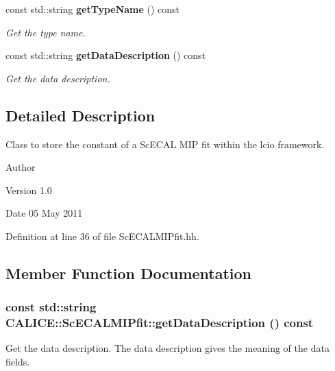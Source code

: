 \begin{DoxyCompactItemize}
\item 
const std::string {\bf getTypeName} () const 
\begin{DoxyCompactList}\small\item\em Get the type name. \item\end{DoxyCompactList}\item 
const std::string {\bf getDataDescription} () const 
\begin{DoxyCompactList}\small\item\em Get the data description. \item\end{DoxyCompactList}\end{DoxyCompactItemize}


\subsection{Detailed Description}
Class to store the constant of a ScECAL MIP fit within the lcio framework. \begin{DoxyAuthor}{Author}

\end{DoxyAuthor}
\begin{DoxyVersion}{Version}
1.0 
\end{DoxyVersion}
\begin{DoxyDate}{Date}
05 May 2011 
\end{DoxyDate}


Definition at line 36 of file ScECALMIPfit.hh.

\subsection{Member Function Documentation}
\subsubsection[{getDataDescription}]{\setlength{\rightskip}{0pt plus 5cm}const std::string CALICE::ScECALMIPfit::getDataDescription () const\hspace{0.3cm}{\ttfamily  [inline]}}\label{classCALICE_1_1ScECALMIPfit_ad23d23514974117e4749189e6e1cce6d}


Get the data description. The data description gives the meaning of the data fields. 

